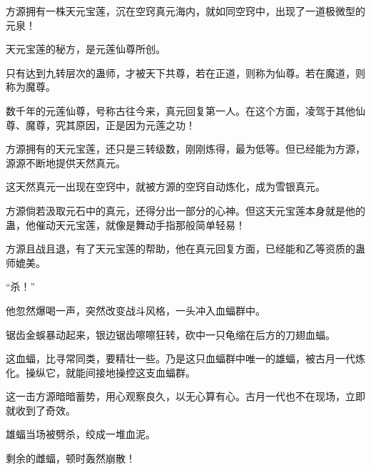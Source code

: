 \begin{this_body}
方源拥有一株天元宝莲，沉在空窍真元海内，就如同空窍中，出现了一道极微型的元泉！

天元宝莲的秘方，是元莲仙尊所创。

只有达到九转层次的蛊师，才被天下共尊，若在正道，则称为仙尊。若在魔道，则称为魔尊。

数千年的元莲仙尊，号称古往今来，真元回复第一人。在这个方面，凌驾于其他仙尊、魔尊，究其原因，正是因为元莲之功！

方源拥有的天元宝莲，还只是三转级数，刚刚炼得，最为低等。但已经能为方源，源源不断地提供天然真元。

这天然真元一出现在空窍中，就被方源的空窍自动炼化，成为雪银真元。

方源倘若汲取元石中的真元，还得分出一部分的心神。但这天元宝莲本身就是他的蛊，他催动天元宝莲，就像是舞动手指那般简单轻易！

方源且战且退，有了天元宝莲的帮助，他在真元回复方面，已经能和乙等资质的蛊师媲美。

“杀！”

他忽然爆喝一声，突然改变战斗风格，一头冲入血蝠群中。

锯齿金蜈暴动起来，银边锯齿嚓嚓狂转，砍中一只龟缩在后方的刀翅血蝠。

这血蝠，比寻常同类，要精壮一些。乃是这只血蝠群中唯一的雄蝠，被古月一代炼化。操纵它，就能间接地操控这支血蝠群。

这一击方源暗暗蓄势，用心观察良久，以无心算有心。古月一代也不在现场，立即就收到了奇效。

雄蝠当场被劈杀，绞成一堆血泥。

剩余的雌蝠，顿时轰然崩散！

\end{this_body}


